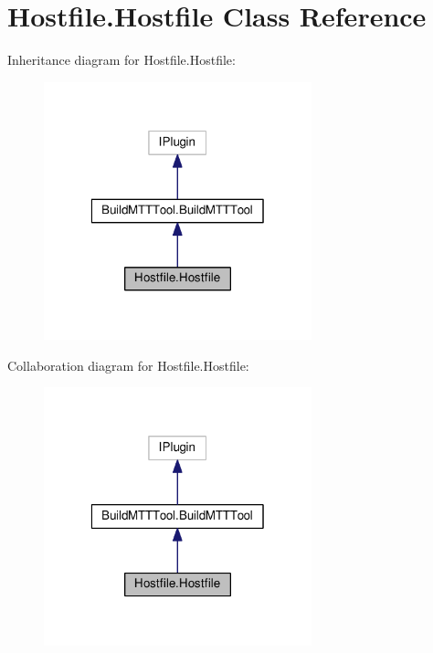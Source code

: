 \hypertarget{classHostfile_1_1Hostfile}{\section{Hostfile.\-Hostfile Class Reference}
\label{classHostfile_1_1Hostfile}
}


Inheritance diagram for Hostfile.\-Hostfile\-:
\nopagebreak
\begin{figure}[H]
\begin{center}
\leavevmode
\includegraphics[width=220pt]{classHostfile_1_1Hostfile__inherit__graph}
\end{center}
\end{figure}


Collaboration diagram for Hostfile.\-Hostfile\-:
\nopagebreak
\begin{figure}[H]
\begin{center}
\leavevmode
\includegraphics[width=220pt]{classHostfile_1_1Hostfile__coll__graph}
\end{center}
\end{figure}
